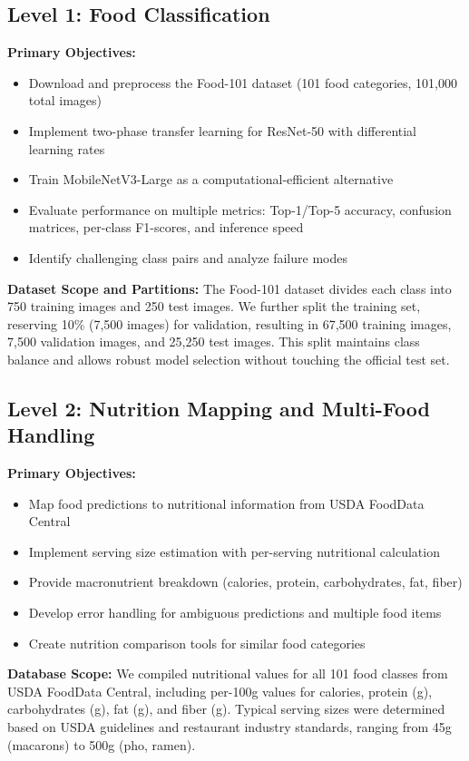 \documentclass[conference]{IEEEtran}
\begin{document}
\subsection{Level 1: Food Classification}
\textbf{Primary Objectives:}
\begin{itemize}
    \item Download and preprocess the Food-101 dataset (101 food categories, 101,000 total images)
    \item Implement two-phase transfer learning for ResNet-50 with differential learning rates
    \item Train MobileNetV3-Large as a computational-efficient alternative
    \item Evaluate performance on multiple metrics: Top-1/Top-5 accuracy, confusion matrices, per-class F1-scores, and inference speed
    \item Identify challenging class pairs and analyze failure modes
\end{itemize}
\textbf{Dataset Scope and Partitions:} The Food-101 dataset divides each class into 750 training images and 250 test images. We further split the training set, reserving 10\% (7,500 images) for validation, resulting in 67,500 training images, 7,500 validation images, and 25,250 test images. This split maintains class balance and allows robust model selection without touching the official test set.

\subsection{Level 2: Nutrition Mapping and Multi-Food Handling}
\textbf{Primary Objectives:}
\begin{itemize}
    \item Map food predictions to nutritional information from USDA FoodData Central
    \item Implement serving size estimation with per-serving nutritional calculation
    \item Provide macronutrient breakdown (calories, protein, carbohydrates, fat, fiber)
    \item Develop error handling for ambiguous predictions and multiple food items
    \item Create nutrition comparison tools for similar food categories
\end{itemize}
\textbf{Database Scope:} We compiled nutritional values for all 101 food classes from USDA FoodData Central, including per-100g values for calories, protein (g), carbohydrates (g), fat (g), and fiber (g). Typical serving sizes were determined based on USDA guidelines and restaurant industry standards, ranging from 45g (macarons) to 500g (pho, ramen).
\end{document}
